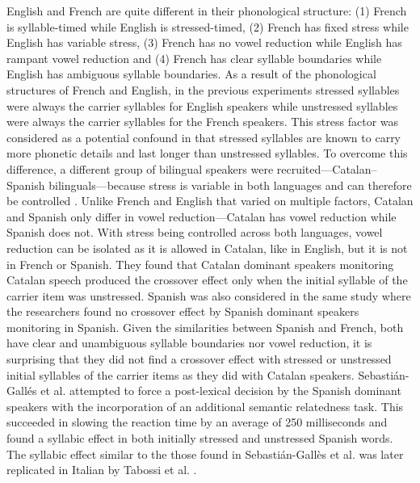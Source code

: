 English and French are quite different in their phonological structure: (1) French is syllable-timed while English is stressed-timed, (2) French has fixed stress while English has variable stress, (3) French has no vowel reduction while English has rampant vowel reduction and (4) French has clear syllable boundaries while English has ambiguous syllable boundaries. As a result of the phonological structures of French and English, in the previous experiments stressed syllables were always the carrier syllables for English speakers while unstressed syllables were always the carrier syllables for the French speakers. This stress factor was considered as a potential confound in that stressed syllables are known to carry more phonetic details and last longer than unstressed syllables. To overcome this difference, a different group of bilingual speakers were recruited—Catalan–Spanish bilinguals—because stress is variable in both languages and can therefore be controlled \parencite{Sebastian-Galles1992-xd}. Unlike French and English that varied on multiple factors, Catalan and Spanish only differ in vowel reduction—Catalan has vowel reduction while Spanish does not. With stress being controlled across both languages, vowel reduction can be isolated as it is allowed in Catalan, like in English, but it is not in French or Spanish. They found that Catalan dominant speakers monitoring Catalan speech produced the crossover effect only when the initial syllable of the carrier item was unstressed. Spanish was also considered in the same study where the researchers found no crossover effect by Spanish dominant speakers monitoring in Spanish. Given the similarities between Spanish and French, both have clear and unambiguous syllable boundaries nor vowel reduction, it is surprising that they did not find a crossover effect with stressed or unstressed initial syllables of the carrier items as they did with Catalan speakers. Sebastián-Gallés et al. \parencite*{Sebastian-Galles1992-xd} attempted to force a post-lexical decision by the Spanish dominant speakers with the incorporation of an additional semantic relatedness task. This succeeded in slowing the reaction time by an average of 250 milliseconds and found a syllabic effect in both initially stressed and unstressed Spanish words. The syllabic effect similar to the those found in Sebastián-Gallès et al. \parencite*{Sebastian-Galles1992-xd} was later replicated in Italian by Tabossi et al. \parencite*{Tabossi2000-xn}.
